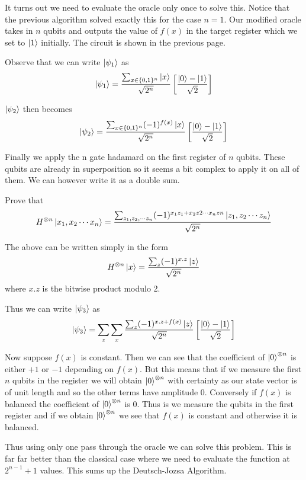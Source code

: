 It turns out we need to evaluate the oracle only once to solve this. Notice that the previous algorithm solved exactly this for the case $n=1$. Our modified oracle takes in $n$ qubits and outputs the value of $f(x)$ in the target register which we set to $\ket{1}$ initially. The circuit is shown in the previous page.

Observe that we can write $\ket{\psi_1}$ as 
$$\ket{\psi_1} = \frac{\sum_{x \in \{0, 1\}^n} \ket{x} }{\sqrt{2^n}} \left[ \frac{\ket{0} - \ket{1}}{\sqrt{2}} \right]$$

$\ket{\psi_2}$ then becomes 
$$\ket{\psi_2} = \frac{\sum_{x \in \{0, 1\}^n} (-1)^{f(x)}\ket{x} }{\sqrt{2^n}} \left[ \frac{\ket{0} - \ket{1}}{\sqrt{2}} \right]$$

Finally we apply the n gate hadamard on the first register of $n$ qubits. These qubits are already in superposition so it seems a bit complex to apply it on all of them. We can however write it as a double sum.

\begin{exercise}
Prove that $$H^{\otimes n} \ket{x_1, x_2 \cdots x_n} = \frac{\sum_{z_1, z_{2}, \cdots z_n}(-1)^{x_{1}z_{1} + x_{2}z{2} \cdots x_{n}z{n}}\ket{z_1, z_2 \cdots z_n}}{\sqrt{2^n}}$$
\end{exercise}

The above can be written simply in the form 
 $$H^{\otimes n} \ket{x} = \frac{\sum_{z}(-1)^{x.z}\ket{z}}{\sqrt{2^n}}$$ 
where $x.z$ is the bitwise product modulo 2.

Thus we can write $\ket{\psi_3}$ as
$$\ket{\psi_3} = \sum_z \sum_x \frac{\sum_{z}(-1)^{x.z + f(x)}\ket{z}}{\sqrt{2^n}}\left[\frac{\ket{0} - \ket{1}}{\sqrt{2}} \right]$$

Now suppose $f(x)$ is constant. Then we can see that the coefficient of $\ket{0}^{\otimes n}$ is either $+1$ or $-1$ depending on $f(x)$. But this means that if we measure the first $n$ qubits in the register we will obtain $\ket{0}^{\otimes n}$ with certainty as our state vector is of unit length and so the other terms have amplitude $0$. Conversely if $f(x)$ is balanced the coefficient of  $\ket{0}^{\otimes n}$ is $0$. Thus is we measure the qubits in the first register and if we obtain $\ket{0}^{\otimes n}$  we see that $f(x)$ is constant and otherwise it is balanced.

Thus using only one pass through the oracle we can solve this problem. This is far far better than the classical case where we need to evaluate the function at $2^{n-1} + 1$ values. This sums up the Deutsch-Jozsa Algorithm.